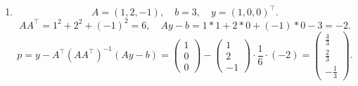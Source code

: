\documentclass[11pt,letter,notitlepage]{article}
\theoremstyle{definition}
\begin{document}
\begin{solution}
\begin{enumerate}[label=(\arabic*)]
\begin{enumerate}[label=(\alph*)]
\[            A A^{\top} \lambda = 2(Ay - b)
            \]
            $A$ has full row rank $\Longrightarrow$ $AA^{\top} \in \mathbb{R}^{m \times m}$ is symmetric positive definite. $\Longrightarrow$ $AA^{\top}$ is invertible.
            \[
            \Longrightarrow
            \lambda
            =
            2(AA^{\top})^{-1}(Ay-b)
            \Longrightarrow
            p=y-A^{\top}(AA^{\top})^{-1}(Ay-b)
            \]
            \item
            \[
            A = (1,2,-1),\quad b=3,\quad y=(1,0,0)^{\top}.
            \]
            \[
            AA^{\top} = 1^2 + 2^2 + (-1)^2 = 6,\quad
            Ay - b = 1*1 + 2*0 + (-1)*0 - 3 = -2.
            \]
            \[
            p = y - A^{\top}(AA^{\top})^{-1}(Ay-b) 
            = 
            \begin{pmatrix}
                1\\
                0\\
                0
            \end{pmatrix} 
            - 
            \begin{pmatrix}
                1\\
                2\\
                -1
            \end{pmatrix}
            \cdot \frac{1}{6} \cdot (-2)
            = 
            \begin{pmatrix}
                \frac{4}{3}\\
                \frac{2}{3}\\
                -\frac{1}{3}
            \end{pmatrix}.
            \]
        \end{enumerate}
        \end{enumerate}
        \end{solution}

    \newpage
\end{document}
